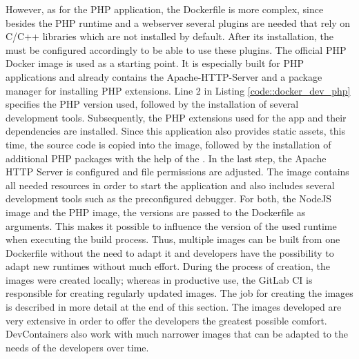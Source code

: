         However, as for the PHP application, the Dockerfile is more complex, since besides the PHP runtime and a webserver several plugins are needed that rely on C/C++ libraries which are not installed by default. After its installation, the  must be configured accordingly to be able to use these plugins. The official PHP Docker image is used as a starting point. It is especially built for PHP applications and already contains the Apache-\acs{HTTP}-Server and a package manager for installing PHP extensions. Line 2 in Listing \ref{code::docker_dev_php} specifies the PHP version used, followed by the installation of several development tools. Subsequently, the PHP extensions used for the app and their dependencies are installed. Since this application also provides static assets, this time, the source code is copied into the image, followed by the installation of additional PHP packages with the help of the . In the last step, the Apache \acs{HTTP} Server is configured and file permissions are adjusted. The image contains all needed resources in order to start the application and also includes several development tools such as the preconfigured  debugger.\newline
        For both, the NodeJS image and the PHP image, the versions are passed to the Dockerfile as arguments. This makes it possible to influence the version of the used runtime when executing the build process. Thus, multiple images can be built from one Dockerfile without the need to adapt it and developers have the possibility to adapt new runtimes without much effort. During the process of creation, the images were created locally; whereas in productive use, the GitLab \ac{CI} is responsible for creating regularly updated images. The job for creating the images is described in more detail at the end of this section. The images developed are very extensive in order to offer the developers the greatest possible comfort. DevContainers also work with much narrower images that can be adapted to the needs of the developers over time.

